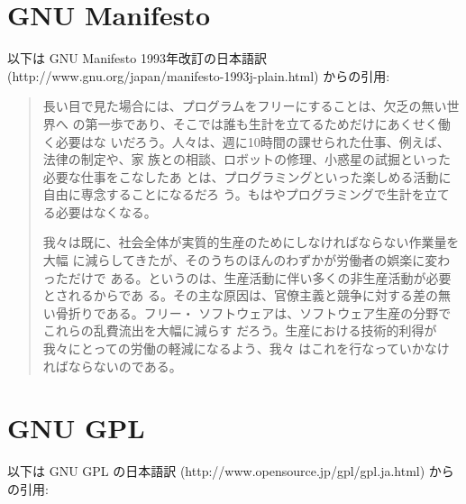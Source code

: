 \documentclass{article}
\begin{document}
\section{GNU Manifesto}
以下は GNU Manifesto 1993年改訂の日本語訳
(http://www.gnu.org/japan/manifesto-1993j-plain.html) からの引用:


\begin{quote}
長い目で見た場合には、プログラムをフリーにすることは、欠乏の無い世界へ
の第一歩であり、そこでは誰も生計を立てるためだけにあくせく働く必要はな
いだろう。人々は、週に10時間の課せられた仕事、例えば、法律の制定や、家
族との相談、ロボットの修理、小惑星の試掘といった必要な仕事をこなしたあ
とは、プログラミングといった楽しめる活動に自由に専念することになるだろ
う。もはやプログラミングで生計を立てる必要はなくなる。


我々は既に、社会全体が実質的生産のためにしなければならない作業量を大幅
に減らしてきたが、そのうちのほんのわずかが労働者の娯楽に変わっただけで
ある。というのは、生産活動に伴い多くの非生産活動が必要とされるからであ
る。その主な原因は、官僚主義と競争に対する差の無い骨折りである。フリー・
ソフトウェアは、ソフトウェア生産の分野でこれらの乱費流出を大幅に減らす
だろう。生産における技術的利得が我々にとっての労働の軽減になるよう、我々
はこれを行なっていかなければならないのである。
\end{quote}


\section{GNU GPL}
以下は GNU GPL の日本語訳
(http://www.opensource.jp/gpl/gpl.ja.html) からの引用:
\end{document}
